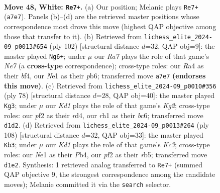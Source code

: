 \documentclass[11pt]{article}
\begin{document}
\clearpage

\begin{figure}[p]\centering
\begin{subfigure}{0.46\textwidth}\centering
\resizebox{\linewidth}{!}{%
\newchessgame
\chessboard[
  setfen={8/R7/8/2p1k2P/R3p3/8/1P3p2/3KN2r w - - 0 48},
  showmover=false,
  pgfstyle=straightmove, color=movearrow, markmove={a7-e7}
]}
\caption{}
\end{subfigure}\hfill
\begin{subfigure}{0.46\textwidth}\centering
\resizebox{\linewidth}{!}{%
\newchessgame
\chessboard[
  setfen={5k2/pR2N3/1p6/2p5/2P2bP1/8/2r5/6K1 w - - 4 52},
  showmover=false,
  pgfstyle=straightmove, color=movearrow, markmove={e7-g6}
]}
\caption{}
\end{subfigure}
\\[4pt]
\begin{subfigure}{0.46\textwidth}\centering
\resizebox{\linewidth}{!}{%
\newchessgame
\chessboard[
  setfen={8/6k1/2b2p2/1p1N1R2/3r2PP/8/6K1/8 w - - 0 40},
  showmover=false,
  pgfstyle=straightmove, color=movearrow, markmove={g2-g3}
]}
\caption{}
\end{subfigure}\hfill
\begin{subfigure}{0.46\textwidth}\centering
\resizebox{\linewidth}{!}{%
\newchessgame
\chessboard[
  setfen={2r5/2P3pk/8/1r6/1P6/2K1p3/4R1R1/8 w - - 3 55},
  showmover=false,
  pgfstyle=straightmove, color=movearrow, markmove={c3-b3}
]}
\caption{}
\end{subfigure}
\caption{\textbf{Move 48, White: \texttt{Re7+}.} (a) Our position; Melanie plays \texttt{Re7+} (\texttt{a7e7}). Panels (b)--(d) are the retrieved master positions whose correspondence most drove this move (highest QAP objective among those that transfer to it). (b) Retrieved from \texttt{lichess\_elite\_2024-09\_p0013\#654} (ply 102) [structural distance $d$=32, QAP obj=9]: the master played \texttt{Ng6+}; under $\mu$ our \emph{Ra7} plays the role of that game's \emph{Ne7} (a \textbf{cross-type} correspondence); cross-type roles: our \emph{R}a4 as their \emph{b}f4, our \emph{N}e1 as their \emph{p}b6; transferred move \texttt{a7e7} \textbf{(endorses this move)}. (c) Retrieved from \texttt{lichess\_elite\_2024-09\_p0010\#356} (ply 78) [structural distance $d$=28, QAP obj=40]: the master played \texttt{Kg3}; under $\mu$ our \emph{Kd1} plays the role of that game's \emph{Kg2}; cross-type roles: our \emph{p}f2 as their \emph{r}d4, our \emph{r}h1 as their \emph{b}c6; transferred move \texttt{d1d2}. (d) Retrieved from \texttt{lichess\_elite\_2024-09\_p0013\#264} (ply 108) [structural distance $d$=32, QAP obj=33]: the master played \texttt{Kb3}; under $\mu$ our \emph{Kd1} plays the role of that game's \emph{Kc3}; cross-type roles: our \emph{N}e1 as their \emph{P}b4, our \emph{p}f2 as their \emph{r}b5; transferred move \texttt{d1e2}. Synthesis: 1 retrieved analog transferred to \texttt{Re7+} (summed QAP objective 9, the strongest correspondence among the candidate moves); Melanie committed it via the \texttt{search} selector.}
\label{fig:thought-m94}
\end{figure}
\end{document}
